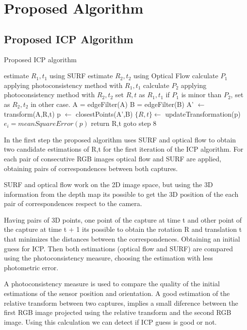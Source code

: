 \section{Proposed Algorithm}

\subsection{Proposed ICP Algorithm}

\begin{algorithm}
\caption{Proposed ICP algorithm}
\begin{algorithmic}[1]
\State estimate $R_1,t_1$ using SURF
\State estimate $R_2,t_2$ using Optical Flow
\State calculate $P_1$ applying photoconsistency method with $R_1,t_1$
\State calculate $P_2$ applying photoconsistency method with $R_2,t_2$
\State set $R,t$ as $R_1,t_1$ if $P_1$ is minor than $P_2$, set as $R_2,t_2$ in other case.
\State A = edgeFilter(A)
\State B = edgeFilter(B)
\State A' $\leftarrow$ transform(A,R,t) 
\State p $\leftarrow$ closestPoints(A',B)
\State $\{R,t\} \gets$ updateTransformation(p)
\State $e_i = meanSquareError(p)$
	\State return R,t
\Else
	\State goto step 8
\EndIf
\end{algorithmic}
\end{algorithm}


In the first step the proposed algorithm uses SURF and optical flow to obtain two candidate estimations of 
R,t for the first iteration of the ICP algorithm. For each pair of consecutive RGB images optical flow 
 and SURF are applied, obtaining pairs of correspondences between both captures. 

SURF and optical flow work on the 2D image space, but using 
the 3D information from the depth map its possible to get the 3D position 
of the each pair of correspondences respect to the camera. 

Having pairs of 3D points, one point of the capture at time t and other point 
of the capture at time t + 1 its possible to obtain the rotation R and translation t
 that minimizes the distances between the correspondences. Obtaining an initial guess 
 for ICP. Then both estimations (optical flow and SURF) are compared using the photoconsistency measure, choosing 
the estimation with less photometric error.

A photoconsistency measure is used to compare the quality of the initial estimations of the sensor
 position and orientation. A good estimation of the relative transform between two captures, implies 
a small diference between the first RGB image projected using the relative transform and the second RGB 
image. Using this calculation we can detect if ICP guess is good or not.


